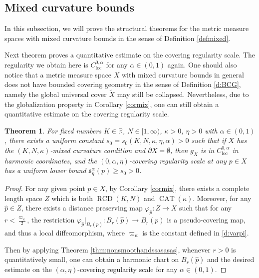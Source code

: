 \documentclass[11pt,reqno]{amsart}
\newtheorem{theorem}{Theorem}[section]
\theoremstyle{definition}
\numberwithin{equation}{section}
\newcommand{\p}{\partial}
\DeclareMathOperator{\CAT}{CAT}
\DeclareMathOperator{\loc}{loc}
\DeclareMathOperator{\RCD}{RCD}
\begin{document}
\subsection{Mixed curvature bounds}\label{ss:mixed-curvature-bounds}

In this subsection, we will prove the structural theorems for the metric measure spaces with mixed curvature bounds in the sense of Definition \ref{defmixed}. 



Next theorem proves a quantitative estimate on the covering regularity scale. 
The regularity we obtain here is $C^{0,\alpha}_{\loc}$ for any $\alpha \in (0,1)$ again. 
One should also notice that a metric measure space $X$ with mixed curvature bounds in general does not have bounded covering geometry in the sense of Definition \ref{d:BCG}, namely the global universal cover $\widetilde{X}$ may still be collapsed. Nevertheless, due to the globalization property in Corollary \ref{cormix}, one can still obtain a quantitative estimate on the covering regularity scale.



\begin{theorem}\label{thm:smoothi}
 For fixed numbers $K \in \mathbb{R}$, $N \in [1, \infty)$, $\kappa >0$, $\eta > 0$ with $\alpha \in (0,1)$, there exists 
a uniform constant $s_0  = s_0 (K, N, \kappa, \eta, \alpha) > 0$ such that if $X$ has the $(K, N, \kappa)$-mixed curvature condition and $\p X = \emptyset$, then $g_X$ is in $C^{0,\alpha}_{\loc}$ in harmonic coordinates, and  the $(0,\alpha,\eta)$-covering regularity scale at any $p \in X$ has a uniform lower bound  $\mathfrak{s}_{\eta}^{\alpha} (p) \geq s_0 > 0$.
\end{theorem}
\begin{proof}
For any given point $p \in X$, 
by Corollary \ref{cormix},
there exists a complete length space $Z$ which is both $\RCD(K, N)$ and $\CAT(\kappa)$. Moreover, for any $\hat{p} \in Z$, there exists  
a distance preserving map $\varphi_{\hat{p}}: Z \to X$ such that for any $r < \frac{\varpi_{\kappa}}{2}$, the restriction $\varphi_{\hat{p}}|_{B_r(\hat{p})}: B_r (\hat{p})\to B_r(p)$
is a pseudo-covering map, and thus a local diffeomorphism, where $\varpi_{\kappa}$ is the constant defined in \eqref{d:varpi}.

Then by applying Theorem \ref{thm:nonsmoothandssasasas}, whenever $r>0$ is quantitatively small, one can obtain a harmonic chart on $B_r(\hat{p})$ and the desired estimate on the $(\alpha, \eta)$-covering regularity scale for any $\alpha \in (0,1)$.
\end{proof}
\end{document}
